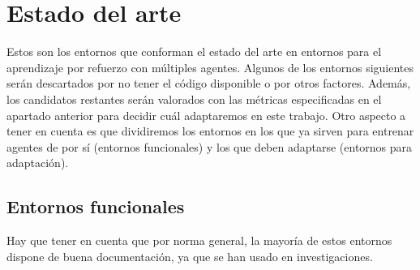 \chapter{Estado del arte}
Estos son los entornos que conforman el estado del arte en entornos para el aprendizaje por refuerzo con múltiples agentes. Algunos de los entornos siguientes serán descartados por no tener el código disponible o por otros factores. Además, los candidatos restantes serán valorados con las métricas especificadas en el apartado anterior para decidir cuál adaptaremos en este trabajo. Otro aspecto a tener en cuenta es que dividiremos los entornos en los que ya sirven para entrenar agentes de por sí (entornos funcionales) y los que deben adaptarse (entornos para adaptación).  

\section{Entornos funcionales}

Hay que tener en cuenta que por norma general, la mayoría de estos entornos dispone de buena documentación, ya que se han usado en investigaciones.

